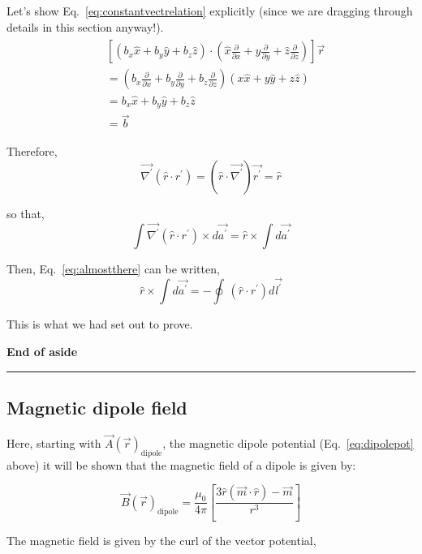 \documentclass[12pt]{article}
\begin{document}
\begin{flushleft}
Let's show Eq.~\ref{eq:constantvectrelation} explicitly (since we are dragging through details in this section anyway!).
\begin{eqnarray*}
\begin{aligned}
& \left[ (b_{x}\hat{x} + b_{y}\hat{y} + b_{z}\hat{z} ) \cdot \left(\hat{x}\frac{\partial}{\partial x} + \hat{y}\frac{\partial}{\partial y} + \hat{z}\frac{\partial}{\partial z}\right) \right] \vec{r} \\[2pt]
& = \left(b_{x}\frac{\partial}{\partial x} + b_{y}\frac{\partial}{\partial y} + b_{z}\frac{\partial}{\partial z}\right)(x\hat{x}+y\hat{y}+z\hat{z}) \\[2pt]
& = b_{x}\hat{x} + b_{y}\hat{y} + b_{z}\hat{z} \\[2pt]
& = \vec{b}
\end{aligned}
\end{eqnarray*}

Therefore,
\[
\vec{\nabla^{\prime}}(\hat{r} \cdot r^{\prime}) = ( \hat{r} \cdot \vec{\nabla^{\prime}} )\vec{r^{\prime}} = \hat{r}
\]

so that,
\[
\int \vec{\nabla^{\prime}}(\hat{r} \cdot r^{\prime}) \times  d\vec{a^{\prime}} = \hat{r} \times \int d\vec{a^{\prime}}
\]

Then, Eq.~\ref{eq:almostthere} can be written, 
\[
\hat{r} \times \int d\vec{a^{\prime}} = - \oint \,(\hat{r} \cdot r^{\prime}) d\vec{l^{\prime}}
\]

This is what we had set out to prove.

{\color{myblue} \bf End of aside}\\
\vspace{-.1in}
{\color{grey} \rule{\linewidth}{0.7mm} }

\subsection*{\bf \color{myblue} Magnetic dipole field}

Here, starting with $\vec{A}(\vec{r})_{\text{dipole}}$, the magnetic dipole potential  (Eq.~\ref{eq:dipolepot} above) it will be shown that the magnetic field of a dipole is given by:

\begin{equation}
\vec{B}(\vec{r})_{\text{dipole}} = \frac{\mu_{0}}{4\pi}\left[  \frac{3\hat{r}(\vec{m}\cdot \hat{r}) - \vec{m}}{r^{3}} \right]
\label{eq:bdipole}
\end{equation}

The magnetic field is given by the curl of the vector potential,


\end{flushleft}
\end{document}
